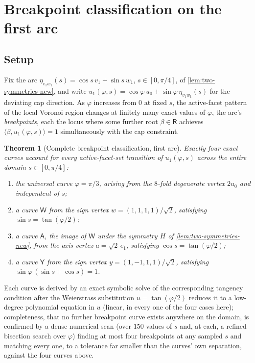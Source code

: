 \documentclass[11pt,reqno]{amsart}
\renewcommand{\_}{\origunderscore\allowbreak}
\numberwithin{equation}{section}
\theoremstyle{plain}
\newtheorem{thm}{Theorem}[section]
\theoremstyle{definition}
\theoremstyle{remark}
\newcommand{\Rt}{\mathsf{R}}                 %
\newcommand{\tilt}{\varphi}                  %
\newcommand{\arcp}{s}                        %
\newcommand{\dev}{\eta}                      %
\newcommand{\base}{u}                        %
\begin{document}
\section{Breakpoint classification on the first arc}\label{sec:arc1-breakpoints}

\subsection{Setup}

Fix the arc $\dev_{v_1w_1}(\arcp)=\cos\arcp\,v_1+\sin\arcp\,w_1$,
$\arcp\in[0,\pi/4]$, of \cref{lem:two-symmetries-new}, and write
$u_1(\tilt,\arcp)=\cos\tilt\,u_0+\sin\tilt\,\dev_{v_1w_1}(\arcp)$ for the
deviating cap direction. As $\tilt$ increases from $0$ at fixed $\arcp$,
the active-facet pattern of the local Voronoi region changes at finitely
many exact values of $\tilt$, the arc's \emph{breakpoints}, each the
locus where some further root $\beta\in\Rt$ achieves
$\langle\beta,u_1(\tilt,\arcp)\rangle=1$ simultaneously with the cap
constraint.

\begin{thm}[Complete breakpoint classification, first arc]\label{thm:arc1-breakpoints-new}
Exactly four exact curves account for every active-facet-set transition
of $u_1(\tilt,\arcp)$ across the entire domain $\arcp\in[0,\pi/4]$:
\begin{enumerate}[leftmargin=2em]
\item the \emph{universal curve} $\tilt=\pi/3$, arising from the
$8$-fold degenerate vertex $2u_0$ and independent of $\arcp$;
\item a curve $\mathsf W$ from the sign vertex
$w=(1,1,1,1)/\sqrt2$, satisfying $\sin\arcp=\tan(\tilt/2)$;
\item a curve $\mathsf A$, the image of $\mathsf W$ under the symmetry
$H$ of \cref{lem:two-symmetries-new}, from the axis vertex
$a=\sqrt2\,e_1$, satisfying $\cos\arcp=\tan(\tilt/2)$;
\item a curve $\mathsf Y$ from the sign vertex
$y=(1,-1,1,1)/\sqrt2$, satisfying
$\sin\tilt\,(\sin\arcp+\cos\arcp)=1$.
\end{enumerate}
\end{thm}

Each curve is derived by an exact symbolic solve of the corresponding
tangency condition after the Weierstrass substitution $\base=\tan(\tilt/2)$
reduces it to a low-degree polynomial equation in $\base$ (linear, in
every one of the four cases here); completeness, that no further
breakpoint curve exists anywhere on the domain, is confirmed by a
dense numerical scan (over $150$ values of $\arcp$ and, at each, a
refined bisection search over $\tilt$) finding at most four breakpoints
at any sampled $\arcp$ and matching every one, to a tolerance far
smaller than the curves' own separation, against the four curves above.
\end{document}
